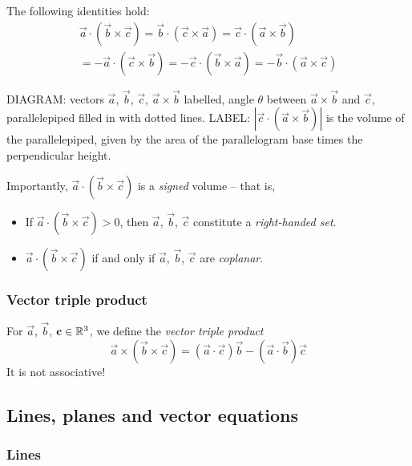 \documentclass{../template/note}
\begin{document}
    The following identities hold:
    \begin{align*}
        \vec a \cdot (\vec b \times \vec c) = \vec b \cdot (\vec c \times \vec a) = \vec c \cdot (\vec a \times \vec b) \\
        = -\vec a \cdot (\vec c \times \vec b) = -\vec c \cdot (\vec b \times \vec a) = -\vec b \cdot (\vec a \times \vec c)
    \end{align*}
    
    DIAGRAM: vectors \(\vec a\), \(\vec b\), \(\vec c\), \(\vec a \times \vec b\) labelled, angle \(\theta\) between \(\vec a \times \vec b\) and \(\vec c\), parallelepiped filled in with dotted lines. LABEL: \(|\vec c \cdot (\vec a \times \vec b)|\) is the volume of the parallelepiped, given by the area of the parallelogram base times the perpendicular height.

    Importantly, \(\vec a \cdot (\vec b \times \vec c)\) is a \emph{signed} volume -- that is,
    \begin{itemize}
        \item If \(\vec a \cdot (\vec b \times \vec c) > 0\), then \(\vec a\), \(\vec b\), \(\vec c\) constitute a \emph{right-handed set}.
        \item \(\vec a \cdot (\vec b \times \vec c)\) if and only if \(\vec a\), \(\vec b\), \(\vec c\) are \emph{coplanar}.
    \end{itemize}
    
    \subsubsection{Vector triple product}

    \begin{definition}
        For \(\vec a\), \(\vec b\), \(\vec c \in \RR^3\), we define the \emph{vector triple product}
        \[  
            \vec a \times (\vec b \times \vec c) = (\vec a \cdot \vec c) \vec b - (\vec a \cdot \vec b) \vec c
        \]
        It is not associative!
    \end{definition}
    
    
    \subsection{Lines, planes and vector equations}

    \subsubsection{Lines}
\end{document}
